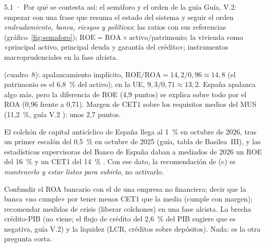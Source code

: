 \begin{complemento}{5.1 · Por qué se contesta así: el semáforo y el orden de la guía}
 Guía, V.2: empezar con una frase que resuma el estado del sistema y seguir el orden \emph{endeudamiento, banca, riesgos y políticas}; las ratios con sus referencias (gráfico~\ref{fig:semaforo}); $\mathrm{ROE}=\mathrm{ROA}\times\text{activo}/\text{patrimonio}$; la vivienda como «principal activo, principal deuda y garantía del crédito»; instrumentos macroprudenciales en la fase alcista.

\begin{figuracaja}
\caption{Semáforo de la banca: referencias de las ratios principales (infografía de la guía)}\label{fig:semaforo}
\end{figuracaja}

 (cuadro~8): apalancamiento implícito, $\mathrm{ROE}/\mathrm{ROA}=14{,}2/0{,}96\approx14{,}8$ (el patrimonio es el 6,8~\% del activo); en la UE, $9{,}3/0{,}71\approx13{,}2$. España apalanca algo más, pero la diferencia de ROE (4,9 puntos) se explica sobre todo por el ROA (0,96 frente a 0,71). Margen de CET1 sobre los requisitos medios del MUS (11,2~\%, guía V.2 \parencite{BCE2025SREP}): unos 2,7 puntos.

 El colchón de capital anticíclico de España llega al 1~\% en octubre de 2026, tras un primer escalón del 0,5~\% en octubre de 2025 \parencite{BdE2025CCA} (guía, tabla de Basilea~III), y las estadísticas supervisoras del Banco de España daban a mediados de 2026 un ROE del 16~\% y un CET1 del 14~\% \parencite{BdE2026EstadSupervisoras}. Con ese dato, la recomendación de (c) es \emph{mantenerlo y estar listos para subirlo}, no activarlo.

 Confundir el ROA bancario con el de una empresa no financiera; decir que la banca «no cumple» por tener menos CET1 que la media (cumple con margen); recomendar medidas de crisis (liberar colchones) en una fase alcista.  La brecha crédito-PIB (no viene; el flujo de crédito del 2,6~\% del PIB sugiere que es negativa, guía V.2) y la liquidez (LCR, créditos sobre depósitos).  Nada: es la otra pregunta corta.
\end{complemento}

